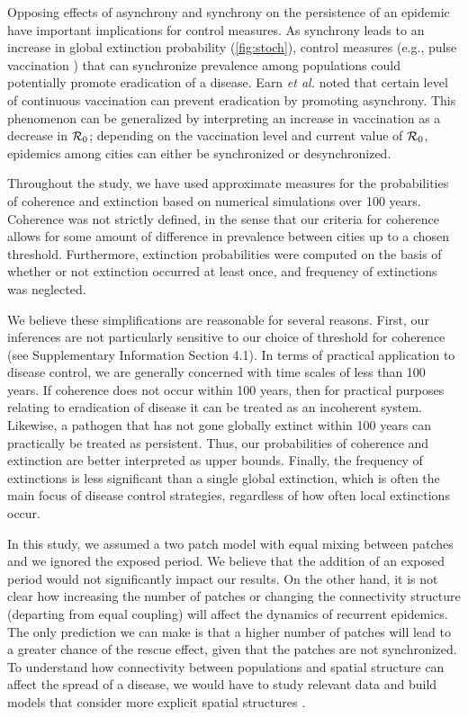 \documentclass[12pt]{article}
\newcommand{\R}{{\cal R}}
\begin{document}
Opposing effects of asynchrony and synchrony on the persistence of an epidemic have important implications for control measures.
As synchrony leads to an increase in global extinction probability (\autoref{fig:stoch}), control measures (e.g., pulse vaccination \cite{agur1993pulse, shulgin1998pulse}) that can synchronize prevalence among populations could potentially promote eradication of a disease.
Earn \textit{et al.} \cite{earn1998persistence} noted that certain level of continuous vaccination can prevent eradication by promoting asynchrony.
This phenomenon can be generalized by interpreting an increase in vaccination as a decrease in $\R_0$; depending on the vaccination level and current value of $\R_0$, epidemics among cities can either be synchronized or desynchronized.

Throughout the study, we have used approximate measures for the probabilities of coherence and extinction based on numerical simulations over 100 years.
Coherence was not strictly defined, in the sense that our criteria for coherence allows for some amount of difference in prevalence between cities up to a chosen threshold.
Furthermore, extinction probabilities were computed on the basis of whether or not extinction occurred at least once, and frequency of extinctions was neglected.

We believe these simplifications are reasonable for several reasons. 
First, our inferences are not particularly sensitive to our choice of threshold for coherence (see Supplementary Information Section 4.1).
In terms of practical application to disease control, we are generally concerned with time scales of less than 100 years. 
If coherence does not occur within 100 years, then for practical purposes relating to eradication of disease it can be treated as an incoherent system.
Likewise, a pathogen that has not gone globally extinct within 100 years can practically be treated as persistent.
Thus, our probabilities of coherence and extinction are better interpreted as upper bounds.
Finally, the frequency of extinctions is less significant than a single global extinction, which is often the main focus of disease control strategies, regardless of how often local extinctions occur.

In this study, we assumed a two patch model with equal mixing between patches and we ignored the exposed period.
We believe that the addition of an exposed period would not significantly impact our results. 
On the other hand, it is not clear how increasing the number of patches or changing the connectivity structure (departing from equal coupling) will affect the dynamics of recurrent epidemics.
The only prediction we can make is that a higher number of patches will lead to a greater chance of the rescue effect, given that the patches are not synchronized.
To understand how connectivity between populations and spatial structure can affect the spread of a disease, we would have to study relevant data and build models that consider more explicit spatial structures \cite{grenfell2001travelling, xia2004measles}.
\end{document}
